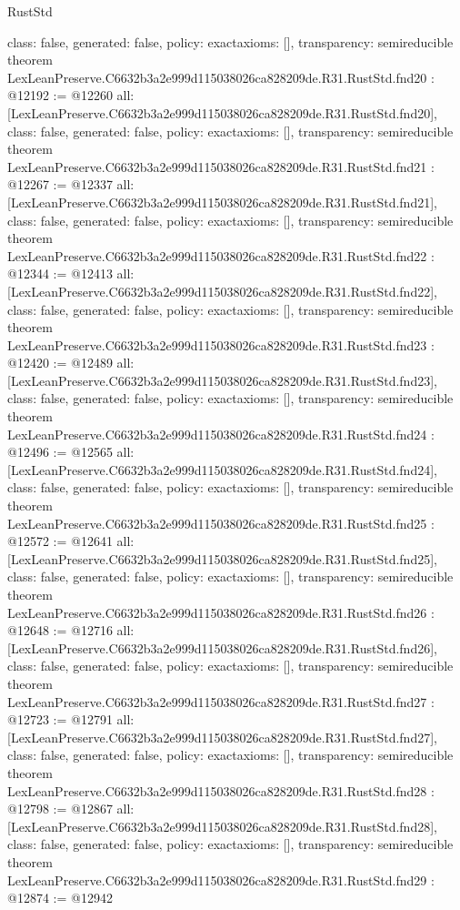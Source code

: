\begin{lexlean}{RustStd}
\begin{coremodule}
{  class: false,
  generated: false,
  policy: exact{axioms: []},
  transparency: semireducible
}
theorem LexLeanPreserve.C6632b3a2e999d115038026ca828209de.R31.RustStd.fnd20 : @12192 := @12260 {
  all: [LexLeanPreserve.C6632b3a2e999d115038026ca828209de.R31.RustStd.fnd20],
  class: false,
  generated: false,
  policy: exact{axioms: []},
  transparency: semireducible
}
theorem LexLeanPreserve.C6632b3a2e999d115038026ca828209de.R31.RustStd.fnd21 : @12267 := @12337 {
  all: [LexLeanPreserve.C6632b3a2e999d115038026ca828209de.R31.RustStd.fnd21],
  class: false,
  generated: false,
  policy: exact{axioms: []},
  transparency: semireducible
}
theorem LexLeanPreserve.C6632b3a2e999d115038026ca828209de.R31.RustStd.fnd22 : @12344 := @12413 {
  all: [LexLeanPreserve.C6632b3a2e999d115038026ca828209de.R31.RustStd.fnd22],
  class: false,
  generated: false,
  policy: exact{axioms: []},
  transparency: semireducible
}
theorem LexLeanPreserve.C6632b3a2e999d115038026ca828209de.R31.RustStd.fnd23 : @12420 := @12489 {
  all: [LexLeanPreserve.C6632b3a2e999d115038026ca828209de.R31.RustStd.fnd23],
  class: false,
  generated: false,
  policy: exact{axioms: []},
  transparency: semireducible
}
theorem LexLeanPreserve.C6632b3a2e999d115038026ca828209de.R31.RustStd.fnd24 : @12496 := @12565 {
  all: [LexLeanPreserve.C6632b3a2e999d115038026ca828209de.R31.RustStd.fnd24],
  class: false,
  generated: false,
  policy: exact{axioms: []},
  transparency: semireducible
}
theorem LexLeanPreserve.C6632b3a2e999d115038026ca828209de.R31.RustStd.fnd25 : @12572 := @12641 {
  all: [LexLeanPreserve.C6632b3a2e999d115038026ca828209de.R31.RustStd.fnd25],
  class: false,
  generated: false,
  policy: exact{axioms: []},
  transparency: semireducible
}
theorem LexLeanPreserve.C6632b3a2e999d115038026ca828209de.R31.RustStd.fnd26 : @12648 := @12716 {
  all: [LexLeanPreserve.C6632b3a2e999d115038026ca828209de.R31.RustStd.fnd26],
  class: false,
  generated: false,
  policy: exact{axioms: []},
  transparency: semireducible
}
theorem LexLeanPreserve.C6632b3a2e999d115038026ca828209de.R31.RustStd.fnd27 : @12723 := @12791 {
  all: [LexLeanPreserve.C6632b3a2e999d115038026ca828209de.R31.RustStd.fnd27],
  class: false,
  generated: false,
  policy: exact{axioms: []},
  transparency: semireducible
}
theorem LexLeanPreserve.C6632b3a2e999d115038026ca828209de.R31.RustStd.fnd28 : @12798 := @12867 {
  all: [LexLeanPreserve.C6632b3a2e999d115038026ca828209de.R31.RustStd.fnd28],
  class: false,
  generated: false,
  policy: exact{axioms: []},
  transparency: semireducible
}
theorem LexLeanPreserve.C6632b3a2e999d115038026ca828209de.R31.RustStd.fnd29 : @12874 := @12942 {
}
\end{coremodule}
\end{lexlean}

